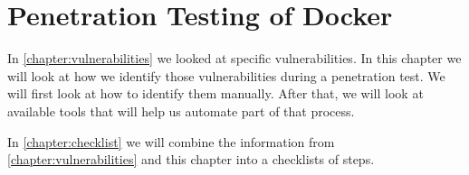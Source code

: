 \chapter{Penetration Testing of Docker}\label{chapter:pentesting}
In \autoref{chapter:vulnerabilities} we looked at specific vulnerabilities. In this chapter we will look at how we identify those vulnerabilities during a penetration test. We will first look at how to identify them manually. After that, we will look at available tools that will help us automate part of that process.

\medskip

In \autoref{chapter:checklist} we will combine the information from \autoref{chapter:vulnerabilities} and this chapter into a checklists of steps.




